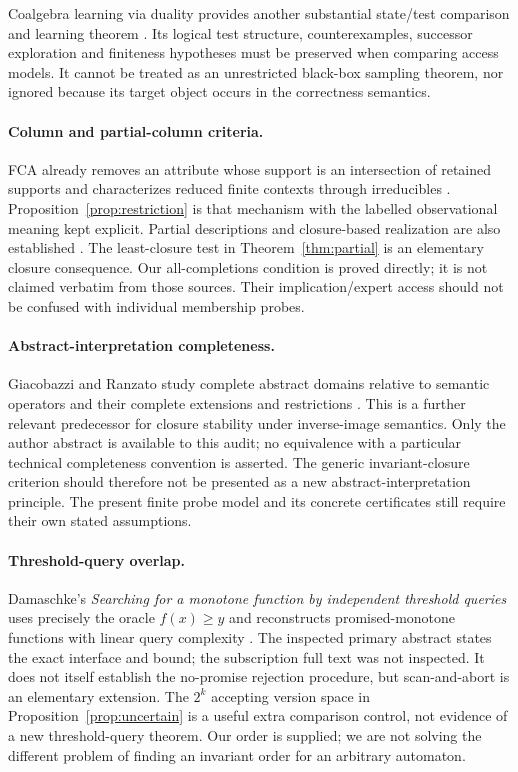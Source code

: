 \documentclass[11pt]{article}
\theoremstyle{remark}
\begin{document}
Coalgebra learning via duality provides another substantial state/test comparison and learning theorem \cite{Duality}. Its logical test structure, counterexamples, successor exploration and finiteness hypotheses must be preserved when comparing access models. It cannot be treated as an unrestricted black-box sampling theorem, nor ignored because its target object occurs in the correctness semantics.

\paragraph{Column and partial-column criteria.}
FCA already removes an attribute whose support is an intersection of retained supports and characterizes reduced finite contexts through irreducibles \cite{FCA}. Proposition~\ref{prop:restriction} is that mechanism with the labelled observational meaning kept explicit. Partial descriptions and closure-based realization are also established \cite{Partial,Exploration}. The least-closure test in Theorem~\ref{thm:partial} is an elementary closure consequence. Our all-completions condition is proved directly; it is not claimed verbatim from those sources. Their implication/expert access should not be confused with individual membership probes.

\paragraph{Abstract-interpretation completeness.}
Giacobazzi and Ranzato study complete abstract domains relative to semantic operators and their complete extensions and restrictions \cite{AbstractInterpretation}. This is a further relevant predecessor for closure stability under inverse-image semantics. Only the author abstract is available to this audit; no equivalence with a particular technical completeness convention is asserted. The generic invariant-closure criterion should therefore not be presented as a new abstract-interpretation principle. The present finite probe model and its concrete certificates still require their own stated assumptions.

\paragraph{Threshold-query overlap.}
Damaschke's \emph{Searching for a monotone function by independent threshold queries} uses precisely the oracle $f(x)\ge y$ and reconstructs promised-monotone functions with linear query complexity \cite{Damaschke}. The inspected primary abstract states the exact interface and bound; the subscription full text was not inspected. It does not itself establish the no-promise rejection procedure, but scan-and-abort is an elementary extension. The $2^k$ accepting version space in Proposition~\ref{prop:uncertain} is a useful extra comparison control, not evidence of a new threshold-query theorem. Our order is supplied; we are not solving the different problem of finding an invariant order for an arbitrary automaton.
\end{document}
